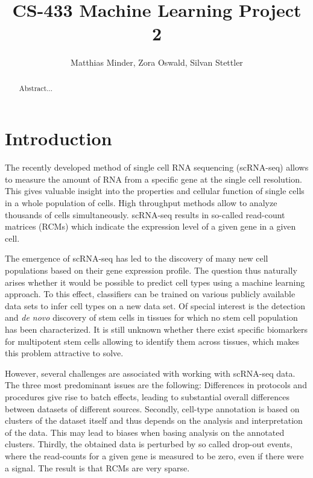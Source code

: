 \documentclass[10pt,conference,compsocconf]{IEEEtran}
\begin{document}
\title{CS-433 Machine Learning Project 2}

\author{
  Matthias Minder, Zora Oswald, Silvan Stettler\\
}

\maketitle

\begin{abstract}
Abstract...
\end{abstract}

\section*{Introduction} 
The recently developed method of single cell RNA sequencing (scRNA-seq) allows to measure the amount of RNA from a specific gene at the single cell resolution. This gives valuable insight into the properties and cellular function of single cells in a whole population of cells. High throughput methods allow to analyze thousands of cells simultaneously. scRNA-seq results in so-called read-count matrices (RCMs) which indicate the expression level of a given gene in a given cell.
\par 
The emergence of scRNA-seq has led to the discovery of many new cell populations based on their gene expression profile. The question thus naturally arises whether it would be possible to predict cell types using a machine learning approach. To this effect, classifiers can be trained on various publicly available data sets to infer cell types on a new data set. Of special interest is the detection and \textit{de novo} discovery of stem cells in tissues for which no stem cell population has been characterized. It is still unknown whether there exist specific biomarkers for multipotent stem cells allowing to identify them across tissues, which makes this problem attractive to solve. 
\par
However, several challenges are associated with working with scRNA-seq data. The three most predominant issues are the following: Differences in protocols and procedures give rise to batch effects, leading to substantial overall differences between datasets of different sources. Secondly, cell-type annotation is based on clusters of the dataset itself and thus depends on the  analysis and interpretation of the data. This may lead to biases when basing analysis on the annotated clusters. Thirdly, the obtained data is perturbed by so called drop-out events, where the read-counts for a given gene is measured to be zero, even if there were a signal. The result is that RCMs are very sparse. 
\end{document}
